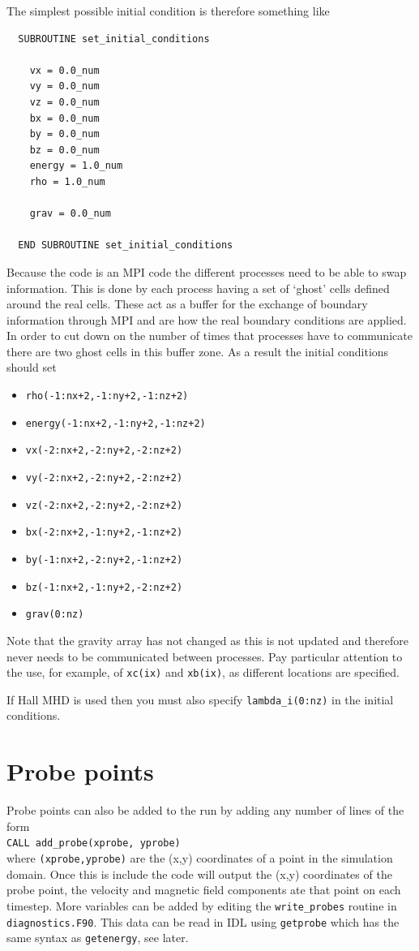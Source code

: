 \documentclass[11pt]{article}
\begin{document}
The simplest possible initial condition is therefore something like
\begin{verbatim}
  SUBROUTINE set_initial_conditions

    vx = 0.0_num
    vy = 0.0_num
    vz = 0.0_num
    bx = 0.0_num
    by = 0.0_num
    bz = 0.0_num
    energy = 1.0_num
    rho = 1.0_num

    grav = 0.0_num

  END SUBROUTINE set_initial_conditions
\end{verbatim}



Because the code is an MPI code the different processes need to be able to swap information. This is done by each process having a set of `ghost' cells defined around the real cells. These act as a buffer for the exchange of boundary information through MPI and are how the real boundary conditions are applied. In order to cut down on the number of times that processes have to communicate there are two ghost cells in this buffer zone. As a result the initial conditions should set
\begin{itemize}
\item \texttt{rho(-1:nx+2,-1:ny+2,-1:nz+2)}
\item \texttt{energy(-1:nx+2,-1:ny+2,-1:nz+2)}
\item \texttt{vx(-2:nx+2,-2:ny+2,-2:nz+2)}
\item \texttt{vy(-2:nx+2,-2:ny+2,-2:nz+2)}
\item \texttt{vz(-2:nx+2,-2:ny+2,-2:nz+2)}
\item \texttt{bx(-2:nx+2,-1:ny+2,-1:nz+2)}
\item \texttt{by(-1:nx+2,-2:ny+2,-1:nz+2)}
\item \texttt{bz(-1:nx+2,-1:ny+2,-2:nz+2)}
\item \texttt{grav(0:nz)}
\end{itemize}
Note that the gravity array has not changed as this is not updated and therefore never needs to be communicated between processes.  Pay particular attention to the use, for example, of \texttt{xc(ix)} and \texttt{xb(ix)}, as different locations are specified.

If Hall MHD is used then you must also specify \texttt{lambda\_i(0:nz)} in the initial conditions.

\section{Probe points}
Probe points can also be added to the run by adding any number of lines of the form\\
\texttt{CALL add\_probe(xprobe, yprobe)}\\
where \texttt{(xprobe,yprobe)} are the (x,y) coordinates of a point in the simulation domain. 
Once this is include the code will output the (x,y) coordinates of the probe point, the velocity 
and magnetic field components ate that point on each timestep. More variables can be added by
editing the \texttt{write\_probes} routine in \texttt{diagnostics.F90}. This data can be read in IDL
using \texttt{getprobe} which has the same syntax as \texttt{getenergy}, see later.
\end{document}

